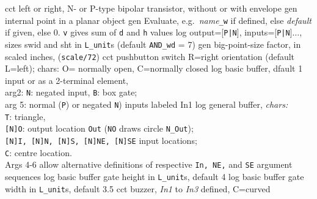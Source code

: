 %
  {cct}%
  {left or right, N- or P-type bipolar transistor, without or with envelope 
    }%
%
  {gen}%
  {internal point in a planar object}%
%
  {gen}%
  {Evaluate, e.g.\ {\sl name}{\tt \_w} if defined, else {\sl default\/}
   if given, else 0. {\tt v} gives sum of {\tt d} and {\tt h} values
     }%
%
  {log}%
  {output=[{\tt P|N}], inputs=[{\tt P|N}]$\ldots$, sizes swid and sht
  in {\tt L\_unit}s (default {\tt AND\_wd} = 7)
    }%
%
  {gen}%
  {big-point-size factor, in scaled inches, ({\tt *scale/72})}%
%
  {cct}%
  {pushbutton switch R=right orientation (default L=left);
     chars: O= normally open, C=normally closed }%
%
  {log}%
  {basic buffer, dfault 1 input or as a 2-terminal element,\\
    arg2: {\tt N}: negated input, {\tt B}: box gate;\\
    arg 5: normal ({\tt P}) or negated {\tt N}) inputs labeled In1 
    }%
%
  {log}%
  {general buffer, {\sl chars:}\\
            {\tt T}: triangle,\\
            {\tt [N]O}: output location {\tt Out}
            ({\tt NO} draws circle {\tt N\_Out});\\
            {\tt [N]I, [N]N, [N]S, [N]NE, [N]SE} input locations;\\
            {\tt C}: centre location.\\
            Args 4-6 allow alternative
            definitions of respective {\tt In, NE,}
            and {\tt SE} argument sequences }%
%
  {log}%
  {basic buffer gate height in {\tt L\_unit}s, default 4}%
%
  {log}%
  {basic buffer gate width in {\tt L\_unit}s, default 3.5}%
%
  {cct}%
  {buzzer, {\sl In1} to {\sl In3} defined, C=curved
   }%


